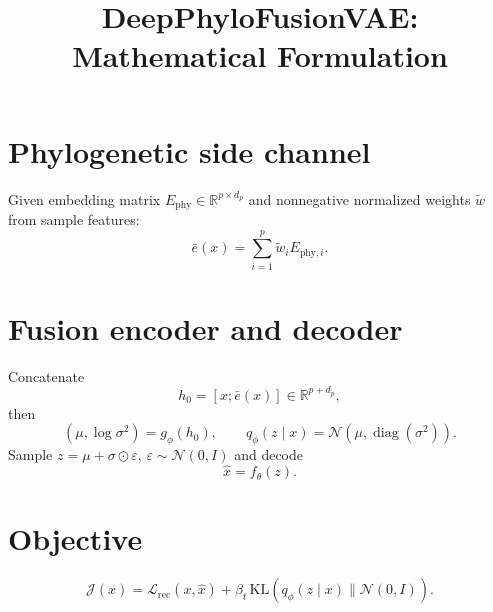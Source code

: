 \documentclass[11pt]{article}
\title{DeepPhyloFusionVAE: Mathematical Formulation}
\date{}
\begin{document}
\maketitle

\section{Phylogenetic side channel}
Given embedding matrix $E_{\mathrm{phy}}\in\mathbb R^{p\times d_p}$ and nonnegative normalized weights $\tilde w$ from sample features:
\begin{equation}
\bar e(x)=\sum_{i=1}^p \tilde w_i E_{\mathrm{phy},i}.
\end{equation}

\section{Fusion encoder and decoder}
Concatenate
\begin{equation}
h_0=[x;\bar e(x)]\in\mathbb R^{p+d_p},
\end{equation}
then
\begin{equation}
(\mu,\log\sigma^2)=g_\phi(h_0),
\qquad
q_\phi(z\mid x)=\mathcal N(\mu,\operatorname{diag}(\sigma^2)).
\end{equation}
Sample $z=\mu+\sigma\odot\varepsilon$, $\varepsilon\sim\mathcal N(0,I)$ and decode
\begin{equation}
\hat x=f_\theta(z).
\end{equation}

\section{Objective}
\begin{equation}
\mathcal J(x)=\mathcal L_{\mathrm{rec}}(x,\hat x)+\beta_t\,\mathrm{KL}(q_\phi(z\mid x)\|\mathcal N(0,I)).
\end{equation}
\end{document}
